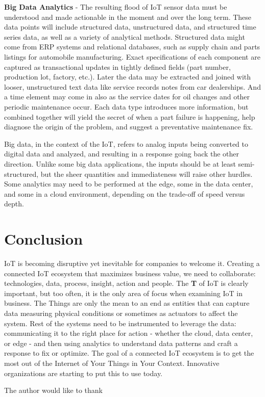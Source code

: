 \documentclass[sigconf]{acmart}
\begin{document}
\textbf{Big Data Analytics} - The resulting flood of IoT sensor data must be understood and made actionable in the moment and over the long term. These data points will include structured data, unstructured data, and structured time series data, as well as a variety of analytical methods. Structured data might come from ERP systems and relational databases, such as supply chain and parts listings for automobile manufacturing. Exact specifications of each component are captured as transactional updates in tightly defined fields (part number, production lot, factory, etc.). Later the data may be extracted and joined with looser, unstructured text data like service records notes from car dealerships. And a time element may come in also as the service dates for oil changes and other periodic maintenance occur. Each data type introduces more information, but combined together will yield the secret of when a part failure is happening, help diagnose the origin of the problem, and suggest a preventative maintenance fix. 

Big data, in the context of the IoT, refers to analog inputs being converted to digital data and analyzed, and resulting in a response going back the other direction. Unlike some big data applications, the inputs should be at least semi-structured, but the sheer quantities and immediateness will raise other hurdles. Some analytics may need to be performed at the edge, some in the data center, and some in a cloud environment, depending on the trade-off of speed versus depth.

\section{Conclusion}

IoT is becoming disruptive yet inevitable for companies to welcome it. Creating a connected IoT ecosystem that maximizes business value, we need to collaborate: technologies, data, process, insight, action and people. The \textbf{T} of IoT is clearly important, but too often, it is the only area of focus when examining IoT in business. The Things are only the mean to an end as entities that can capture data measuring physical conditions or sometimes as actuators to affect the system. Rest of the systems need to be instrumented to leverage the data: communicating it to the right place for action - whether the cloud, data center, or edge - and then using analytics to understand data patterns and craft a response to fix or optimize. The goal of a connected IoT ecosystem is to get the most out of the Internet of Your Things in Your Context. Innovative organizations are starting to put this to use today.

\begin{acks}

  The author would like to thank 

\end{acks}


 
\end{document}

